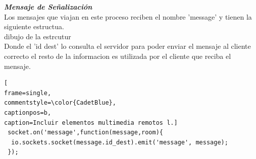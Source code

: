 \textbf{\textit{Mensaje de Señalización}}
\\Los mensajes que viajan en este proceso reciben el nombre  'message' y tienen la siguiente estructua.
\\dibujo de la estrcutur
\\Donde el 'id dest' lo consulta el servidor para poder enviar el mensaje al cliente correcto el resto de la informacion es utilizada por el cliente que reciba el mensaje.
\begin{lstlisting}[
frame=single,
commentstyle=\color{CadetBlue},
captionpos=b,
caption=Incluir elementos multimedia remotos l.]
 socket.on('message',function(message,room){
  io.sockets.socket(message.id_dest).emit('message', message);
 });
\end{lstlisting}